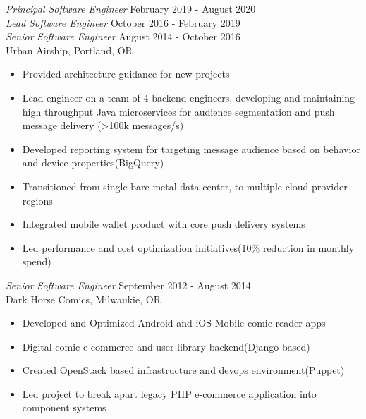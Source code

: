 \documentclass[margin]{res}
\begin{document}
\begin{resume}
                {\sl Principal Software Engineer} \hfill February 2019 -  August 2020 \\
                {\sl Lead Software Engineer} \hfill October 2016 -  February 2019 \\
                {\sl Senior Software Engineer} \hfill August 2014 - October 2016 \\
                Urban Airship, Portland, OR
                 \begin{itemize}  \itemsep -2pt %
                     \item Provided architecture guidance for new projects
                     \item Lead engineer on a team of 4 backend engineers, developing and maintaining high throughput Java microservices for audience segmentation and push message delivery (\textgreater100k messages/s)
                     \item Developed reporting system for targeting message audience based on behavior and device properties(BigQuery)
                     \item Transitioned from single bare metal data center, to multiple cloud provider regions
                     \item Integrated mobile wallet product with core push delivery systems
                     \item Led performance and cost optimization initiatives(10\% reduction in monthly spend)
                 \end{itemize}

                {\sl Senior Software Engineer} \hfill September 2012 - August 2014 \\
                Dark Horse Comics, Milwaukie, OR
                 \begin{itemize}  \itemsep -2pt %
                    \item Developed and Optimized Android and iOS Mobile comic reader apps
                       \item Digital comic e-commerce and user library backend(Django based)
                      \item Created OpenStack based infrastructure and devops environment(Puppet)
                    \item Led project to break apart legacy PHP e-commerce application into component systems
                \end{itemize}


\end{resume}
\end{document}
